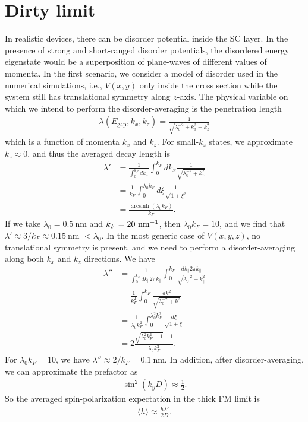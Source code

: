 \documentclass{article}
\DeclareMathOperator\arcsinh{arcsinh}
\newcommand{\nn}{\nonumber \\}
\begin{document}
\section{Dirty limit}
In realistic devices, there can be disorder potential inside the SC layer. In the presence of strong and short-ranged disorder potentials, the disordered energy eigenstate would be a superposition of plane-waves of different values of momenta. In the first scenario, we consider a model of disorder used in the numerical simulations, i.e., $V(x,y)$ only inside the cross section while the system still has translational symmetry along $z$-axis. The physical variable on which we intend to perform the disorder-averaging is the penetration length
\begin{align}
\lambda(E_{\text{gap}}, k_x, k_z) = \frac{1}{\sqrt{\lambda^{-2}_0 + k^2_x + k^2_z }}
\end{align}
which is a function of momenta $k_x$ and $k_z$. For small-$k_z$ states, we approximate $k_z \approx 0$, and thus the averaged decay length is
\begin{align}
\lambda' &= \frac{1}{\int^{k_F}_0 dk_x} \int^{k_F}_0 dk_x \frac{1}{\sqrt{\lambda^{-2}_0 + k^2_x  }} \nn
&=\frac{1}{k_F} \int^{\lambda_0 k_F}_0 d \xi \frac{1}{\sqrt{1 + \xi^2  }} \nn
&= \frac{ \arcsinh (\lambda_0 k_F)}{k_F}.
\end{align}
If we take $\lambda_0 = 0.5~$nm and $k_F = 20~\rm{nm}^{-1}$, then $\lambda_0k_F=10$, and we find that $\lambda' \approx 3/k_F \approx 0.15~$nm $< \lambda_0$. In the most generic case of $V(x,y,z)$, no translational symmetry is present, and we need to perform a disorder-averaging along both $k_x$ and $k_z$ directions. We have
\begin{align}
\lambda'' &= \frac{1}{\int^{k_F}_0 dk_{\parallel} 2\pi k_{\parallel} }  \int^{k_F}_0  \frac{dk_{\parallel} 2\pi k_{\parallel}}{\sqrt{\lambda^{-2}_0 + k^2_{\parallel}  }} \nn
&= \frac{1}{k^2_F} \int^{k_F}_0 \frac{dk^2}{ \sqrt{\lambda^{-2}_0 + k^2 }} \nn
&=\frac{1}{ \lambda_0 k^2_F} \int^{\lambda^2_0 k^2_F}_0 \frac{d\xi}{ \sqrt{1 + \xi }} \nn
&= 2 \frac{ \sqrt{\lambda^2_0 k^2_F+1 } -1 }{\lambda_0 k^2_F}.
\end{align}
For $\lambda_0 k_F = 10$, we have $\lambda'' \approx 2/k_F = 0.1~$nm. In addition, after disorder-averaging, we can approximate the prefactor as
\begin{align}
\sin^2 (k_y D) \approx \frac{1}{2}.
\end{align}
So the averaged spin-polarization expectation in the thick FM limit is
\begin{align}
\langle h \rangle \approx   \frac{h \lambda'}{2D}.
\end{align}
\end{document}
